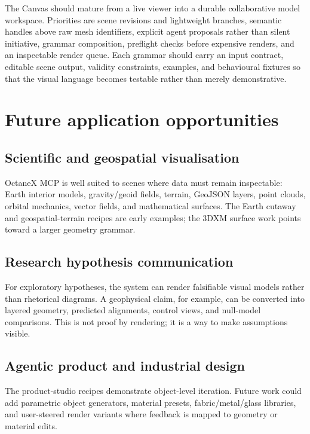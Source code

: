 \documentclass[11pt,a4paper]{article}
\newcommand{\project}{OctaneX MCP}
\begin{document}
The Canvas should mature from a live viewer into a durable collaborative model
workspace. Priorities are scene revisions and lightweight branches, semantic
handles above raw mesh identifiers, explicit agent proposals rather than silent
initiative, grammar composition, preflight checks before expensive renders, and
an inspectable render queue. Each grammar should carry an input contract,
editable scene output, validity constraints, examples, and behavioural fixtures
so that the visual language becomes testable rather than merely demonstrative.

\section{Future application opportunities}

\subsection{Scientific and geospatial visualisation}

\project{} is well suited to scenes where data must remain inspectable: Earth interior models, gravity/geoid fields, terrain, GeoJSON layers, point clouds, orbital mechanics, vector fields, and mathematical surfaces. The Earth cutaway and geospatial-terrain recipes are early examples; the 3DXM surface work points toward a larger geometry grammar.

\subsection{Research hypothesis communication}

For exploratory hypotheses, the system can render falsifiable visual models rather than rhetorical diagrams. A geophysical claim, for example, can be converted into layered geometry, predicted alignments, control views, and null-model comparisons. This is not proof by rendering; it is a way to make assumptions visible.

\subsection{Agentic product and industrial design}

The product-studio recipes demonstrate object-level iteration. Future work could add parametric object generators, material presets, fabric/metal/glass libraries, and user-steered render variants where feedback is mapped to geometry or material edits.
\end{document}
